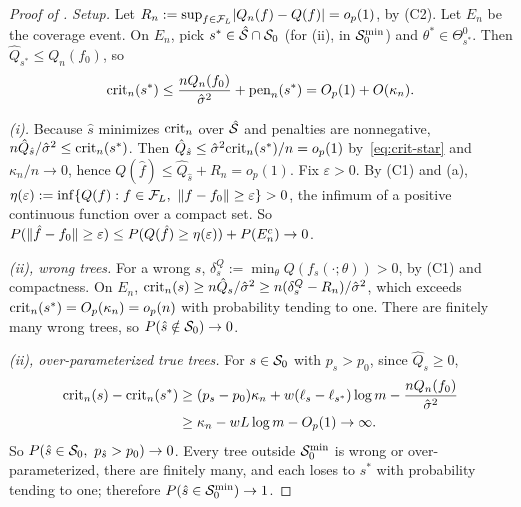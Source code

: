 \begin{proof}[Proof of ]
\emph{Setup.} Let $R_n := \sup_{f \in \mathcal{F}_L}\lvert Q_n(f) - Q(f)\rvert = o_p(1)$, by (C2). Let $E_n$ be the coverage event. On $E_n$, pick $s^* \in \hat{\mathcal{S}} \cap \mathcal{S}_0$ (for (ii), in $\mathcal{S}_0^{\min}$) and $\theta^* \in \Theta_{s^*}^0$. Then $\hat Q_{s^*} \le Q_n(f_0)$, so
\begin{equation}
\mathrm{crit}_n(s^*) \le \frac{nQ_n(f_0)}{\hat\sigma^2} + \mathrm{pen}_n(s^*) = O_p(1) + O(\kappa_n).
\label{eq:crit-star}
\end{equation}

\emph{(i).} Because $\hat s$ minimizes $\mathrm{crit}_n$ over $\hat{\mathcal{S}}$ and penalties are nonnegative, $n\hat Q_{\hat s}/\hat\sigma^2 \le \mathrm{crit}_n(s^*)$. Then $\hat Q_{\hat s} \le \hat\sigma^2\mathrm{crit}_n(s^*)/n = o_p(1)$ by~\eqref{eq:crit-star} and $\kappa_n/n \to 0$, hence $Q(\hat f) \le \hat Q_{\hat s} + R_n = o_p(1)$. Fix $\varepsilon > 0$. By (C1) and (a), $\eta(\varepsilon) := \inf\{Q(f) : f \in \mathcal{F}_L,\ \lVert f - f_0\rVert \ge \varepsilon\} > 0$, the infimum of a positive continuous function over a compact set. So $P(\lVert \hat f - f_0\rVert \ge \varepsilon) \le P(Q(\hat f) \ge \eta(\varepsilon)) + P(E_n^c) \to 0$.

\emph{(ii), wrong trees.} For a wrong $s$, $\delta_s^Q := \min_\theta Q(f_s(\cdot;\theta)) > 0$, by (C1) and compactness. On $E_n$, $\mathrm{crit}_n(s) \ge n\hat Q_s/\hat\sigma^2 \ge n(\delta_s^Q - R_n)/\hat\sigma^2$, which exceeds $\mathrm{crit}_n(s^*) = O_p(\kappa_n) = o_p(n)$ with probability tending to one. There are finitely many wrong trees, so $P(\hat s \notin \mathcal{S}_0) \to 0$.

\emph{(ii), over-parameterized true trees.} For $s \in \mathcal{S}_0$ with $p_s > p_0$, since $\hat Q_s \ge 0$,
\begin{align*}
\mathrm{crit}_n(s) - \mathrm{crit}_n(s^*) &\ge (p_s - p_0)\kappa_n + w(\ell_s - \ell_{s^*})\log m - \frac{nQ_n(f_0)}{\hat\sigma^2} \\
&\ge \kappa_n - wL\log m - O_p(1) \to \infty.
\end{align*}
So $P(\hat s \in \mathcal{S}_0,\ p_{\hat s} > p_0) \to 0$. Every tree outside $\mathcal{S}_0^{\min}$ is wrong or over-parameterized, there are finitely many, and each loses to $s^*$ with probability tending to one; therefore $P(\hat s \in \mathcal{S}_0^{\min}) \to 1$.
\end{proof}

